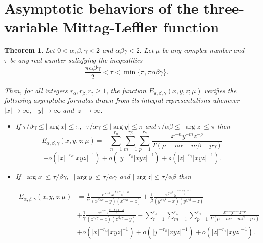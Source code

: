 \documentclass[12pt, reqno]{amsart}
\newtheorem{theorem}{Theorem}[section]
\theoremstyle{definition}
\theoremstyle{remark}
\numberwithin{equation}{section}
\begin{document}
\section{Asymptotic behaviors of the three-variable Mittag-Leffler function }\label{sec4}
\begin{theorem}\label{thm4.1}
    Let $0<\alpha,\beta,\gamma<2$ and $\alpha\beta\gamma<2$. Let $\mu$ be any complex number and
$\tau$ be any real number satisfying the inequalities
\begin{equation}\label{4.1}
\frac{\pi\alpha\beta\gamma}{2}<\tau< \min\{\pi,\pi\alpha\beta\gamma\}.
\end{equation}

Then, for all integers $r_{\alpha},r_{\beta,}r_{\gamma}\geq 1$, the function
$E_{\alpha,\beta,\gamma}(x,y,z;\mu)$ verifies the following asymptotic formulas
drawn from its integral representations whenever $|x|\to\infty$,\,\,
$|y|\to\infty$ and $|z|\to\infty$.
\begin{itemize}
    \item If $\tau/\beta\gamma \leq |\arg x| \leq \pi$,\,\, 
$\tau/\alpha\gamma \leq |\arg y| \leq \pi$ and $\tau/\alpha\beta \leq |\arg z| \leq \pi$ then
$$E_{\alpha,\beta,\gamma}(x,y,z;\mu)
=-\sum_{n=1}^{r_{\alpha}}
\sum_{m=1}^{r_{\beta}}
\sum_{p=1}^{r_{\gamma}}
\frac{x^{-n}y^{-m}z^{-p}}{\Gamma(\mu-n\alpha-m\beta-p\gamma)}$$
$$+o\!\left(|x|^{-r_{\alpha}}|xyz|^{-1}\right)
+
o\!\left(|y|^{-r_{\beta}}|xyz|^{-1}\right)
+
o\left(|z|^{-r_{\gamma}}|xyz|^{-1}\right).$$

\item If $ |\arg x| \leq \tau/\beta\gamma $,\,\, 
$  |\arg y| \leq \tau/\alpha\gamma$ and $  |\arg z| \leq \tau/\alpha\beta$ then

$$\begin{aligned}
E_{\alpha,\beta,\gamma}(x,y,z;\mu)&=\frac{1}{\alpha}\frac{
e^{x^{1/\alpha}}
\,x^{\frac{\beta+\gamma+1-\mu}{\alpha}}}
{(x^{\beta/\alpha}-y)(x^{\gamma/\alpha}-z)}+\frac{1}{\beta}\frac{
e^{y^{1/\beta}}
\,y^{\frac{\alpha+\gamma+1-\mu}{\beta}}}
{(y^{\alpha/\beta}-x)(y^{\gamma/\beta}-z)}\\
&+
\frac{1}{\gamma}\frac{
e^{z^{1/\gamma}}
\,z^{\frac{\alpha+\beta+1-\mu}{\gamma}}}
{(z^{\alpha/\gamma}-x)(z^{\beta/\gamma}-y)}
-\sum_{n=1}^{r_{\alpha}}
\sum_{m=1}^{r_{\beta}}
\sum_{p=1}^{r_{\gamma}}
\frac{x^{-n}y^{-m}z^{-p}}{\Gamma(\mu-n\alpha-m\beta-p\gamma)}\\
&+o\!\left(|x|^{-r_{\alpha}}|xyz|^{-1}\right)
+
o\!\left(|y|^{-r_{\beta}}|xyz|^{-1}\right)
+
o\left(|z|^{-r_{\gamma}}|xyz|^{-1}\right).\end{aligned}$$
\end{itemize}
\end{theorem}
\end{document}
